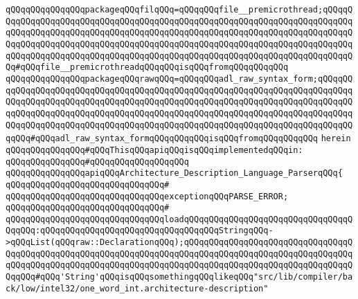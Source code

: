 \verb|qQQqqQQqqQQqqQQqpackageqQQqfilqQQq=qQQqqQQqfile__premicrothread;qQQqqQQqqQQqqQQqqQQqqQQqqQQqqQQqqQQqqQQqqQQqqQQqqQQqqQQqqQQqqQQqqQQqqQQqqQQqqQQqqQQqqQQqqQQqqQQqqQQqqQQqqQQqqQQqqQQqqQQqqQQqqQQqqQQqqQQqqQQqqQQqqQQqqQQqqQQqqQQqqQQqqQQqqQQqqQQqqQQqqQQqqQQqqQQqqQQqqQQqqQQqqQQqqQQqqQQqqQQqqQQqqQQqqQQqqQQqqQQqqQQqqQQqqQQqqQQqqQQqqQQqqQQqqQQqqQQqqQQqqQQqqQQq#qQQqfile__premicrothreadqQQqqQQqisqQQqfromqQQqqQQqqQQq|\newline
\verb|qQQqqQQqqQQqqQQqpackageqQQqrawqQQq=qQQqqQQqadl_raw_syntax_form;qQQqqQQqqQQqqQQqqQQqqQQqqQQqqQQqqQQqqQQqqQQqqQQqqQQqqQQqqQQqqQQqqQQqqQQqqQQqqQQqqQQqqQQqqQQqqQQqqQQqqQQqqQQqqQQqqQQqqQQqqQQqqQQqqQQqqQQqqQQqqQQqqQQqqQQqqQQqqQQqqQQqqQQqqQQqqQQqqQQqqQQqqQQqqQQqqQQqqQQqqQQqqQQqqQQqqQQqqQQqqQQqqQQqqQQqqQQqqQQqqQQqqQQqqQQqqQQqqQQqqQQqqQQqqQQqqQQqqQQqqQQqqQQqqQQq#qQQqadl_raw_syntax_formqQQqqQQqqQQqisqQQqfromqQQqqQQqqQQq|\newline
\verb|herein|\newline
\newline
\verb|qQQqqQQqqQQqqQQq#qQQqThisqQQqapiqQQqisqQQqimplementedqQQqin:|\newline
\verb|qQQqqQQqqQQqqQQq#qQQqqQQqqQQqqQQqqQQq|\newline
\newline
\verb|qQQqqQQqqQQqqQQqapiqQQqArchitecture_Description_Language_ParserqQQq{|\newline
\verb|qQQqqQQqqQQqqQQqqQQqqQQqqQQqqQQq#|\newline
\verb|qQQqqQQqqQQqqQQqqQQqqQQqqQQqqQQqexceptionqQQqPARSE_ERROR;|\newline
\verb|qQQqqQQqqQQqqQQqqQQqqQQqqQQqqQQq#|\newline
\verb|qQQqqQQqqQQqqQQqqQQqqQQqqQQqqQQqloadqQQqqQQqqQQqqQQqqQQqqQQqqQQqqQQqqQQqqQQq:qQQqqQQqqQQqqQQqqQQqqQQqqQQqqQQqqQQqStringqQQq->qQQqList(qQQqraw::DeclarationqQQq);qQQqqQQqqQQqqQQqqQQqqQQqqQQqqQQqqQQqqQQqqQQqqQQqqQQqqQQqqQQqqQQqqQQqqQQqqQQqqQQqqQQqqQQqqQQqqQQqqQQqqQQqqQQqqQQqqQQqqQQqqQQqqQQqqQQqqQQqqQQqqQQqqQQqqQQqqQQqqQQqqQQqqQQqqQQqqQQqqQQq#qQQq'String'qQQqisqQQqsomethingqQQqlikeqQQq"src/lib/compiler/back/low/intel32/one_word_int.architecture-description"|\newline
